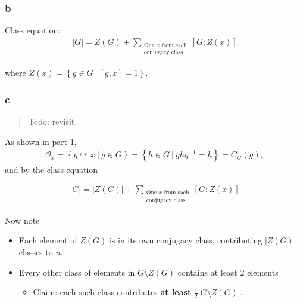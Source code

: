 \begin{solution}
\hypertarget{b-1}{%
\subsubsection{b}\label{b-1}}

Class equation:
\begin{align*}
{\left\lvert {G} \right\rvert} = Z(G) + \sum_{\substack{\text{One $x$ from each} \\ \text{conjugacy class}}}[G: Z(x)]
\end{align*}

where \(Z(x) = \left\{{g\in G {~\mathrel{\Big|}~}[g, x] = 1}\right\}\).

\hypertarget{c-1}{%
\subsubsection{c}\label{c-1}}

\begin{quote}
Todo: revisit.
\end{quote}

As shown in part 1,
\begin{align*}
\mathcal{O}_x = \left\{{g\curvearrowright x {~\mathrel{\Big|}~}g\in G}\right\} = \left\{{h\in G {~\mathrel{\Big|}~}ghg^{-1}= h}\right\} = C_G(g)
,\end{align*}
and by the class equation

\begin{align*}
{\left\lvert {G} \right\rvert} = {\left\lvert {Z(G)} \right\rvert} + \sum_{\substack{\text{One $x$ from each} \\ \text{conjugacy class}}}[G: Z(x)]
\end{align*}

Now note

\begin{itemize}
\item
  Each element of \(Z(G)\) is in its own conjugacy class, contributing
  \({\left\lvert {Z(G)} \right\rvert}\) classes to \(n\).
\item
  Every other class of elements in \(G\setminus Z(G)\) contains at least
  2 elements

  \begin{itemize}
  \tightlist
  \item
    Claim: each such class contributes \textbf{at least}
    \(\frac 1 2 {\left\lvert {G \setminus Z(G)} \right\rvert}\).
  \end{itemize}
\end{itemize}


\end{solution}
